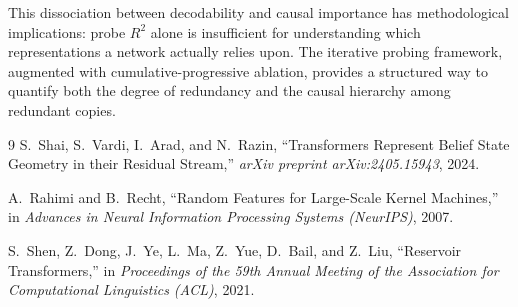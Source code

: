 \documentclass[11pt]{article}
\begin{document}
This dissociation between decodability and causal importance has methodological implications: probe $R^2$ alone is insufficient for understanding which representations a network actually relies upon.  The iterative probing framework, augmented with cumulative-progressive ablation, provides a structured way to quantify both the degree of redundancy and the causal hierarchy among redundant copies.

\begin{thebibliography}{9}
S.~Shai, S.~Vardi, I.~Arad, and N.~Razin,
``Transformers Represent Belief State Geometry in their Residual Stream,''
\emph{arXiv preprint arXiv:2405.15943}, 2024.

A.~Rahimi and B.~Recht,
``Random Features for Large-Scale Kernel Machines,''
in \emph{Advances in Neural Information Processing Systems (NeurIPS)}, 2007.

S.~Shen, Z.~Dong, J.~Ye, L.~Ma, Z.~Yue, D.~Bail, and Z.~Liu,
``Reservoir Transformers,''
in \emph{Proceedings of the 59th Annual Meeting of the Association for Computational Linguistics (ACL)}, 2021.
\end{thebibliography}
\end{document}
